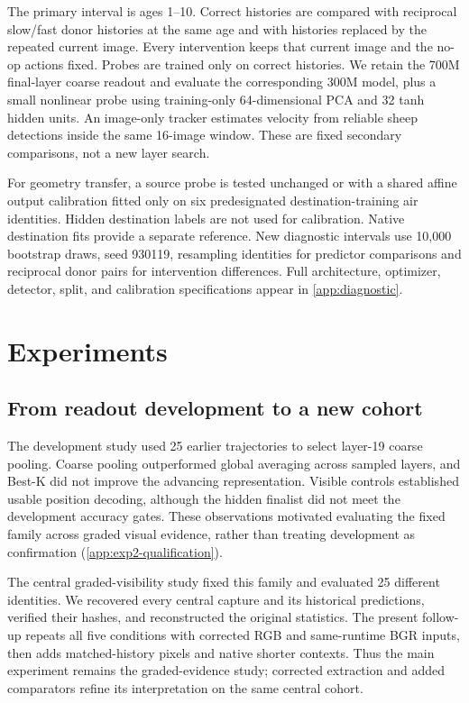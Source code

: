 \documentclass{article}
\begin{document}
The primary interval is ages 1--10. Correct histories are compared with reciprocal slow/fast donor histories at the same age and with histories replaced by the repeated current image. Every intervention keeps that current image and the no-op actions fixed. Probes are trained only on correct histories. We retain the 700M final-layer coarse readout and evaluate the corresponding 300M model, plus a small nonlinear probe using training-only 64-dimensional PCA and 32 tanh hidden units. An image-only tracker estimates velocity from reliable sheep detections inside the same 16-image window. These are fixed secondary comparisons, not a new layer search.

For geometry transfer, a source probe is tested unchanged or with a shared affine output calibration fitted only on six predesignated destination-training air identities. Hidden destination labels are not used for calibration. Native destination fits provide a separate reference. New diagnostic intervals use 10,000 bootstrap draws, seed 930119, resampling identities for predictor comparisons and reciprocal donor pairs for intervention differences. Full architecture, optimizer, detector, split, and calibration specifications appear in \autoref{app:diagnostic}.

\section{Experiments}
\label{sec:experiments}
\subsection{From readout development to a new cohort}
The development study used 25 earlier trajectories to select layer-19 coarse pooling. Coarse pooling outperformed global averaging across sampled layers, and Best-K did not improve the advancing representation. Visible controls established usable position decoding, although the hidden finalist did not meet the development accuracy gates. These observations motivated evaluating the fixed family across graded visual evidence, rather than treating development as confirmation (\autoref{app:exp2-qualification}).

The central graded-visibility study fixed this family and evaluated 25 different identities. We recovered every central capture and its historical predictions, verified their hashes, and reconstructed the original statistics. The present follow-up repeats all five conditions with corrected RGB and same-runtime BGR inputs, then adds matched-history pixels and native shorter contexts. Thus the main experiment remains the graded-evidence study; corrected extraction and added comparators refine its interpretation on the same central cohort.
\end{document}
